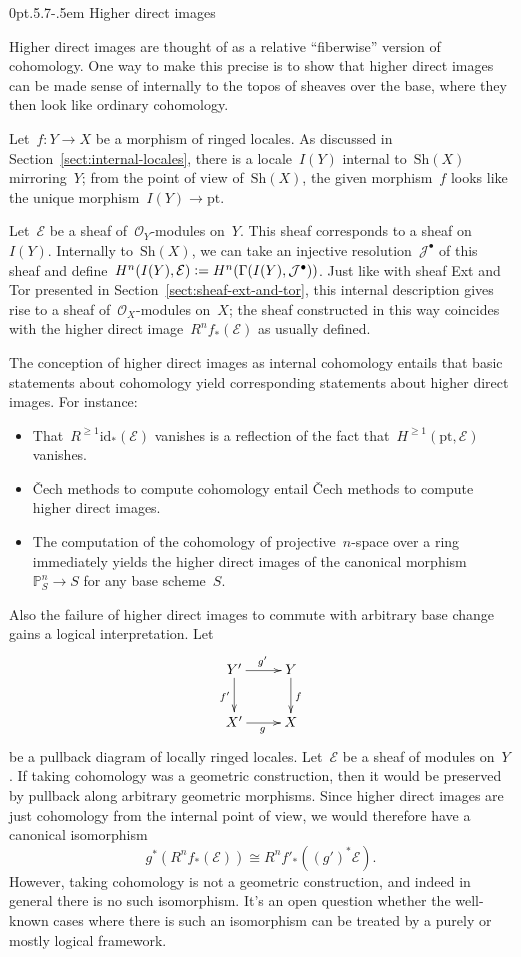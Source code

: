 \documentclass[10pt,reqno,a4paper]{amsbook}
\makeatletter
\theoremstyle{definition}
\theoremstyle{plain}
\theoremstyle{remark}
\newcommand{\E}{\mathcal{E}}
\renewcommand{\O}{\mathcal{O}}
\newcommand{\J}{\mathcal{J}}
\newcommand{\PP}{\mathbb{P}}
\newcommand{\id}{\mathrm{id}}
\newcommand{\Sh}{\mathrm{Sh}}
\newcommand{\pt}{\mathrm{pt}}
\newcommand{\?}{\,{:}\,}
\renewcommand{\_}{\mathpunct{.}\,}
\newcommand{\defeq}{\vcentcolon=}
\def\subsection{\@startsection{subsection}{2}%
  {0pt}{.5\linespacing\@plus.7\linespacing}{-.5em}%
  {\normalfont\bfseries}}
\makeatother
\begin{document}
\subsection{Higher direct images}\label{sect:higher-direct-images}

Higher direct images are thought of as a relative ``fiberwise'' version of
cohomology. One way to make this precise is to show that higher direct images
can be made sense of internally to the topos of sheaves over the base, where
they then look like ordinary cohomology.

Let~$f : Y \to X$ be a morphism of ringed locales. As discussed in
Section~\ref{sect:internal-locales}, there is a locale~$I(Y)$ internal
to~$\Sh(X)$ mirroring~$Y$; from the point of view of~$\Sh(X)$, the given
morphism~$f$ looks like the unique morphism~$I(Y) \to \pt$.

Let~$\E$ be a sheaf of~$\O_Y$-modules on~$Y$. This sheaf corresponds to a sheaf
on~$I(Y)$. Internally to~$\Sh(X)$, we can take an injective
resolution~$\J^\bullet$ of this sheaf and define~$H^n(I(Y), \E) \defeq
H^n(\Gamma(I(Y), \J^\bullet))$. Just like with sheaf Ext and Tor presented in
Section~\ref{sect:sheaf-ext-and-tor}, this internal description gives rise to
a sheaf of~$\O_X$-modules on~$X$; the sheaf constructed in this way coincides
with the higher direct image~$R^n f_*(\E)$ as usually defined.

The conception of higher direct images as internal cohomology entails that
basic statements about cohomology yield corresponding statements about higher
direct images. For instance:

\begin{itemize}
\item That~$R^{\geq1} \id_*(\E)$ vanishes is a reflection of the fact
that~$H^{\geq1}(\pt, \E)$ vanishes.
\item Čech methods to compute cohomology entail Čech methods to compute higher
direct images.
\item The computation of the cohomology of projective~$n$-space over a ring
immediately yields the higher direct images of the canonical morphism~$\PP^n_S
\to S$ for any base scheme~$S$.
\end{itemize}

Also the failure of higher direct images to commute with arbitrary base change
gains a logical interpretation. Let
\[ \xymatrix{
  Y' \ar[r]^{g'}\ar[d]_{f'} & Y \ar[d]^f \\
  X' \ar[r]_g & X
} \]
be a pullback diagram of locally ringed locales. Let~$\E$ be a sheaf of modules on~$Y$.
If taking cohomology was a geometric construction, then it would be preserved
by pullback along arbitrary geometric morphisms. Since higher direct images are
just cohomology from the internal point of view, we would therefore have a
canonical isomorphism
\[ g^*(R^nf_*(\E)) \cong R^nf'_*((g')^*\E). \]
However, taking cohomology is not a geometric construction, and indeed in
general there is no such isomorphism. It's an open question whether the
well-known cases where there is such an isomorphism can be treated by a purely
or mostly logical framework.
\end{document}
